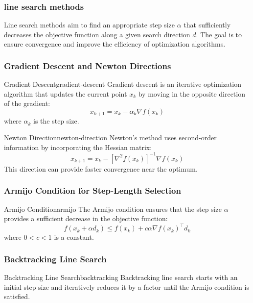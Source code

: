 \subsubsection*{line search methods}
Line search methods aim to find an appropriate step size \( \alpha \) that sufficiently decreases the objective function along a given search direction \( d \). The goal is to ensure convergence and improve the efficiency of optimization algorithms.

\subsubsection*{Gradient Descent and Newton Directions}

\begin{definition}{Gradient Descent}{gradient-descent}
  Gradient descent is an iterative optimization algorithm that updates the current point \( x_k \) by moving in the opposite direction of the gradient:
  \[
    x_{k+1} = x_k - \alpha_k \nabla f(x_k)
  \]
  where \( \alpha_k \) is the step size.
\end{definition}

\begin{definition}{Newton Direction}{newton-direction}
  Newton's method uses second-order information by incorporating the Hessian matrix:
  \[
    x_{k+1} = x_k - [\nabla^2 f(x_k)]^{-1} \nabla f(x_k)
  \]
  This direction can provide faster convergence near the optimum.
\end{definition}

\subsubsection*{Armijo Condition for Step-Length Selection}

\begin{definition}{Armijo Condition}{armijo}
  The Armijo condition ensures that the step size \( \alpha \) provides a sufficient decrease in the objective function:
  \[
    f(x_k + \alpha d_k) \leq f(x_k) + c \alpha \nabla f(x_k)^\top d_k
  \]
  where \( 0 < c < 1 \) is a constant.
\end{definition}

\subsubsection*{Backtracking Line Search}

\begin{definition}{Backtracking Line Search}{backtracking}
  Backtracking line search starts with an initial step size and iteratively reduces it by a factor until the Armijo condition is satisfied.

\end{definition}

